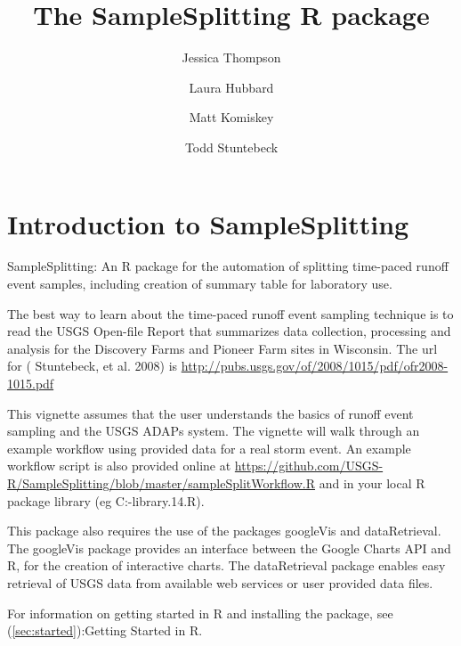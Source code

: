 \documentclass[a4paper,11pt]{article}
\begin{document}





\title{The SampleSplitting R package}
\author[1]{Jessica Thompson}
\author[1]{Laura Hubbard}
\author[1]{Matt Komiskey}
\author[1]{Todd Stuntebeck}




\maketitle
\tableofcontents

\section{Introduction to SampleSplitting}

SampleSplitting: An R package for the automation of splitting time-paced runoff event samples, including creation of summary table for laboratory use.

The best way to learn about the time-paced runoff event sampling technique is to read the USGS Open-file Report that summarizes data collection, processing and analysis for the Discovery Farms and Pioneer Farm sites in Wisconsin. The url for (\cite{Stuntebeck} Stuntebeck, et al. 2008) is 
\url{http://pubs.usgs.gov/of/2008/1015/pdf/ofr2008-1015.pdf}

This vignette assumes that the user understands the basics of runoff event sampling and the USGS ADAPs system. The vignette will walk through an example workflow using provided data for a real storm event. An example workflow script is also provided online at \url {https://github.com/USGS-R/SampleSplitting/blob/master/sampleSplitWorkflow.R} and in your local R package library (eg C:\Users\jlthomps\Documents\R\win-library\2.14\SampleSplitting\sampleSplitWorkflow.R).

This package also requires the use of the packages googleVis and dataRetrieval. The googleVis package provides an interface between the Google Charts API and R, for the creation of interactive charts. The dataRetrieval package enables easy retrieval of USGS data from available web services or user provided data files.

For information on getting started in R and installing the package, see (\ref{sec:started}):Getting Started in R. 
\end{document}
